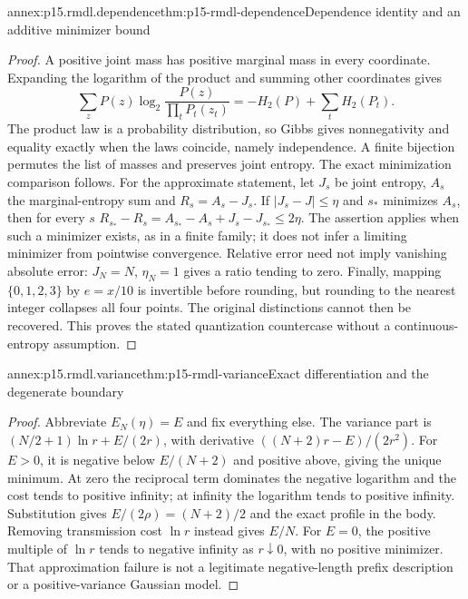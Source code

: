 \begin{annexitem}{annex:p15.rmdl.dependence}{thm:p15-rmdl-dependence}{Dependence identity and an additive minimizer bound}
\begin{proof}
A positive joint mass has positive marginal mass in every coordinate.
Expanding the logarithm of the product and summing other coordinates gives
\[
 \sum_zP(z)\log_2\frac{P(z)}{\prod_tP_t(z_t)}
       =-H_2(P)+\sum_tH_2(P_t).
\]
The product law is a probability distribution, so Gibbs gives
nonnegativity and equality exactly when the laws coincide, namely
independence. A finite bijection permutes the list of masses and preserves
joint entropy. The exact minimization comparison follows.
For the approximate statement, let \(J_s\) be joint entropy,
\(A_s\) the marginal-entropy sum and \(R_s=A_s-J_s\).
If \(\lvert J_s-J\rvert\leq\eta\) and \(s_*\) minimizes \(A_s\),
then for every \(s\)
\(R_{s_*}-R_s=A_{s_*}-A_s+J_s-J_{s_*}\leq2\eta\).
The assertion applies when such a minimizer exists, as in a finite
family; it does not infer a limiting minimizer from pointwise convergence.
Relative error need not imply vanishing absolute error: \(J_N=N\),
\(\eta_N=1\) gives a ratio tending to zero. Finally, mapping
\(\{0,1,2,3\}\) by \(e=x/10\) is invertible before rounding, but
rounding to the nearest integer collapses all four points. The original
distinctions cannot then be recovered. This proves the stated quantization
countercase without a continuous-entropy assumption.
\end{proof}
\end{annexitem}

\begin{annexitem}{annex:p15.rmdl.variance}{thm:p15-rmdl-variance}{Exact differentiation and the degenerate boundary}
\begin{proof}
Abbreviate \(E_N(\eta)=E\) and fix everything else. The variance
part is \((N/2+1)\ln r+E/(2r)\), with derivative
\(((N+2)r-E)/(2r^2)\). For \(E>0\), it is negative below
\(E/(N+2)\) and positive above, giving the unique minimum.
At zero the reciprocal term dominates the negative logarithm and the
cost tends to positive infinity; at infinity the logarithm tends to
positive infinity. Substitution gives \(E/(2\rho)=(N+2)/2\) and
the exact profile in the body. Removing transmission cost \(\ln r\)
instead gives \(E/N\). For \(E=0\), the positive multiple of
\(\ln r\) tends to negative infinity as \(r\downarrow0\), with
no positive minimizer. That approximation failure is not a legitimate
negative-length prefix description or a positive-variance Gaussian model.
\end{proof}
\end{annexitem}

